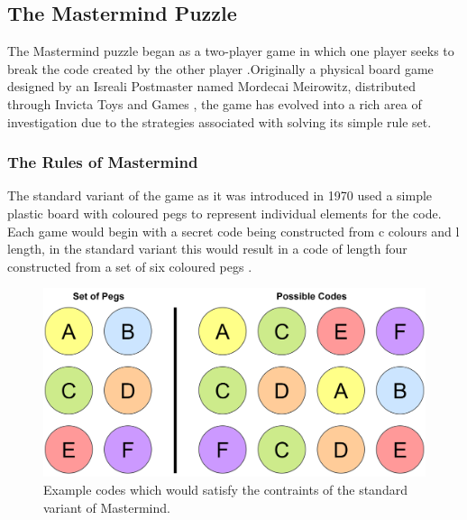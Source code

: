 \documentclass[12pt]{article}  %
\theoremstyle{definition}
\theoremstyle{remark}
\begin{document}
\subsection {The Mastermind Puzzle}

The Mastermind puzzle began as a two-player game in which one player seeks to break the code created by the other player \cite{Wolfram}.Originally a physical board game designed by an Isreali Postmaster named Mordecai Meirowitz, distributed through Invicta Toys and Games \cite{Invicta}, the game has evolved into a rich area of investigation due to the strategies
associated with solving its simple rule set.

\subsubsection {The Rules of Mastermind}

The standard variant of the game as it was introduced in 1970 used a simple plastic board with coloured pegs to represent individual elements for the code.
Each game would begin with a secret code being constructed from c colours and l length, in the standard variant this would result in a code of length four constructed from a set
of six coloured pegs \cite{Wolfram}.

\begin{figure}[H]
\centering
\includegraphics[scale=0.5]{pegs}
\caption{ Example codes which would satisfy the contraints of the standard variant of Mastermind.}
\end{figure}
\end{document}
